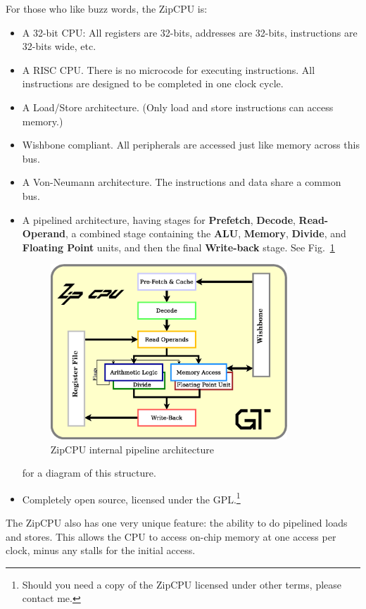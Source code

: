 \documentclass{gqtekspec}
\begin{document}
For those who like buzz words, the ZipCPU is:
\begin{itemize}
\item A 32-bit CPU: All registers are 32-bits, addresses are 32-bits,
		instructions are 32-bits wide, etc.
\item A RISC CPU.  There is no microcode for executing instructions.  All
	instructions are designed to be completed in one clock cycle.
\item A Load/Store architecture.  (Only load and store instructions
		can access memory.)
\item Wishbone compliant.  All peripherals are accessed just like
		memory across this bus.
\item A Von-Neumann architecture.  The instructions and data share a 
		common bus.
\item A pipelined architecture, having stages for {\bf Prefetch},
	{\bf Decode}, {\bf Read-Operand}, a combined stage containing
	the {\bf ALU}, {\bf Memory}, {\bf Divide}, and {\bf Floating Point}
	units, and then the final {\bf Write-back} stage. 
		See Fig.~\ref{fig:cpu}
\begin{figure}\begin{center}
\includegraphics[width=3.5in]{../gfx/cpu.eps}
\caption{ZipCPU internal pipeline architecture}\label{fig:cpu}
\end{center}\end{figure}
		for a diagram of this structure.
\item Completely open source, licensed under the GPL.\footnote{Should you
	need a copy of the ZipCPU licensed under other terms, please 
	contact me.}
\end{itemize}

The ZipCPU also has one very unique feature: the ability to do pipelined loads
and stores.  This allows the CPU to access on-chip memory at one access per
clock, minus any stalls for the initial access.
\end{document}
